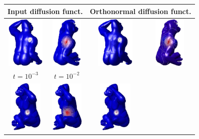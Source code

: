 \documentclass[acmtog,authorversion]{acmart}
\begin{document}
\begin{figure}[t]
\centering
\begin{tabular}{cc|cc}
\multicolumn{2}{c|}{Input diffusion funct.} 
&\multicolumn{2}{|c}{Orthonormal diffusion funct.}\\
\hline
\includegraphics[height=70pt]{FMAP-images/monkey-diff-input-10-5.jpg}
&\includegraphics[height=70pt]{FMAP-images/monkey-diff-input-10-4.jpg}
&\includegraphics[height=70pt]{FMAP-images/monkey-diff-input-10-5-ORTH.jpg}
&\includegraphics[height=70pt]{FMAP-images/monkey-diff-input-10-4-ORTH.jpg}\\
$t=10^{-3}$ &$t=10^{-2}$ & &\\
\hline
\includegraphics[height=70pt]{FMAP-images/monkey-duffusion-support-13-input.jpg}
&\includegraphics[height=70pt]{FMAP-images/monkey-duffusion-support-3-input.jpg}
&\includegraphics[height=70pt]{FMAP-images/monkey-duffusion-support-13-orth.jpg}

\end{tabular}
\end{figure}
\end{document}
